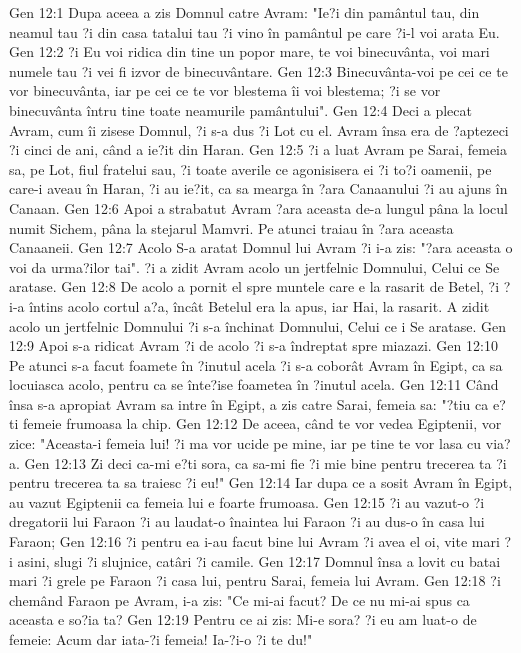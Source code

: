 Gen 12:1  Dupa aceea a zis Domnul catre Avram: "Ie?i din pamântul tau, din neamul tau ?i din casa tatalui tau ?i vino în pamântul pe care ?i-l voi arata Eu.
Gen 12:2  ?i Eu voi ridica din tine un popor mare, te voi binecuvânta, voi mari numele tau ?i vei fi izvor de binecuvântare.
Gen 12:3  Binecuvânta-voi pe cei ce te vor binecuvânta, iar pe cei ce te vor blestema îi voi blestema; ?i se vor binecuvânta întru tine toate neamurile pamântului".
Gen 12:4  Deci a plecat Avram, cum îi zisese Domnul, ?i s-a dus ?i Lot cu el. Avram însa era de ?aptezeci ?i cinci de ani, când a ie?it din Haran.
Gen 12:5  ?i a luat Avram pe Sarai, femeia sa, pe Lot, fiul fratelui sau, ?i toate averile ce agonisisera ei ?i to?i oamenii, pe care-i aveau în Haran, ?i au ie?it, ca sa mearga în ?ara Canaanului ?i au ajuns în Canaan.
Gen 12:6  Apoi a strabatut Avram ?ara aceasta de-a lungul pâna la locul numit Sichem, pâna la stejarul Mamvri. Pe atunci traiau în ?ara aceasta Canaaneii.
Gen 12:7  Acolo S-a aratat Domnul lui Avram ?i i-a zis: "?ara aceasta o voi da urma?ilor tai". ?i a zidit Avram acolo un jertfelnic Domnului, Celui ce Se aratase.
Gen 12:8  De acolo a pornit el spre muntele care e la rasarit de Betel, ?i ?i-a întins acolo cortul a?a, încât Betelul era la apus, iar Hai, la rasarit. A zidit acolo un jertfelnic Domnului ?i s-a închinat Domnului, Celui ce i Se aratase.
Gen 12:9  Apoi s-a ridicat Avram ?i de acolo ?i s-a îndreptat spre miazazi.
Gen 12:10  Pe atunci s-a facut foamete în ?inutul acela ?i s-a coborât Avram în Egipt, ca sa locuiasca acolo, pentru ca se înte?ise foametea în ?inutul acela.
Gen 12:11  Când însa s-a apropiat Avram sa intre în Egipt, a zis catre Sarai, femeia sa: "?tiu ca e?ti femeie frumoasa la chip.
Gen 12:12  De aceea, când te vor vedea Egiptenii, vor zice: "Aceasta-i femeia lui! ?i ma vor ucide pe mine, iar pe tine te vor lasa cu via?a.
Gen 12:13  Zi deci ca-mi e?ti sora, ca sa-mi fie ?i mie bine pentru trecerea ta ?i pentru trecerea ta sa traiesc ?i eu!"
Gen 12:14  Iar dupa ce a sosit Avram în Egipt, au vazut Egiptenii ca femeia lui e foarte frumoasa.
Gen 12:15  ?i au vazut-o ?i dregatorii lui Faraon ?i au laudat-o înaintea lui Faraon ?i au dus-o în casa lui Faraon;
Gen 12:16  ?i pentru ea i-au facut bine lui Avram ?i avea el oi, vite mari ?i asini, slugi ?i slujnice, catâri ?i camile.
Gen 12:17  Domnul însa a lovit cu batai mari ?i grele pe Faraon ?i casa lui, pentru Sarai, femeia lui Avram.
Gen 12:18  ?i chemând Faraon pe Avram, i-a zis: "Ce mi-ai facut? De ce nu mi-ai spus ca aceasta e so?ia ta?
Gen 12:19  Pentru ce ai zis: Mi-e sora? ?i eu am luat-o de femeie: Acum dar iata-?i femeia! Ia-?i-o ?i te du!"
